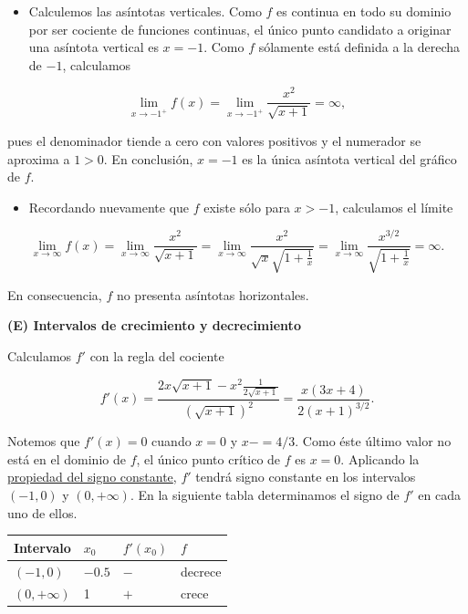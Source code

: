 \documentclass[
  letterpaper,
]{book}
\providecommand{\tightlist}{%
  \setlength{\itemsep}{0pt}\setlength{\parskip}{0pt}}
\theoremstyle{plain}
\theoremstyle{remark}
\begin{document}
\begin{tcolorbox}
\begin{itemize}
\tightlist
\item
  Calculemos las asíntotas verticales. Como \(f\) es continua en todo su
  dominio por ser cociente de funciones continuas, el único punto
  candidato a originar una asíntota vertical es \(x=-1\). Como \(f\)
  sólamente está definida a la derecha de \(-1\), calculamos
\end{itemize}

\[
\lim_{x\to -1^+} f(x)=\lim_{x\to -1^+} \frac{x^2}{\sqrt{x+1}}=\infty,
\]

pues el denominador tiende a cero con valores positivos y el numerador
se aproxima a \(1>0\). En conclusión, \(x=-1\) es la única asíntota
vertical del gráfico de \(f\).

\begin{itemize}
\tightlist
\item
  Recordando nuevamente que \(f\) existe sólo para \(x>-1\), calculamos
  el límite
\end{itemize}

\[
\lim_{x\to\infty} f(x)=\lim_{x\to \infty} \frac{x^2}{\sqrt{x+1}}=\lim_{x\to \infty} \frac{x^2}{\sqrt{x}\sqrt{1+\frac{1}{x}}}=\lim_{x\to \infty} \frac{x^{3/2}}{\sqrt{1+\frac{1}{x}}}=\infty.
\]

En consecuencia, \(f\) no presenta asíntotas horizontales.

\textbf{(E) Intervalos de crecimiento y decrecimiento}

Calculamos \(f'\) con la regla del cociente

\[
f'(x)=\frac{2x\sqrt{x+1}-x^2\frac{1}{2\sqrt{x+1}}}{\left(\sqrt{x+1}\right)^2}=\frac{x(3x+4)}{2(x+1)^{3/2}}.
\]

Notemos que \(f'(x)=0\) cuando \(x=0\) y \(x-=4/3\). Como éste último
valor no está en el dominio de \(f\), el único punto crítico de \(f\) es
\(x=0\). Aplicando la \hyperref[teo-propiedad-signoconst]{propiedad del
signo constante}, \(f'\) tendrá signo constante en los intervalos
\((-1, 0)\) y \((0,+\infty)\). En la siguiente tabla determinamos el
signo de \(f'\) en cada uno de ellos.

\begin{longtable}[]{@{}llll@{}}
\toprule\noalign{}
Intervalo & \(x_0\) & \(f'(x_0)\) & \(f\) \\
\midrule\noalign{}
\endhead
\bottomrule\noalign{}
\endlastfoot
\((-1,0)\) & \(-0.5\) & \(-\) & decrece \\
\((0,+\infty)\) & 1 & \(+\) & crece \\
\end{longtable}


\end{tcolorbox}
\end{document}
